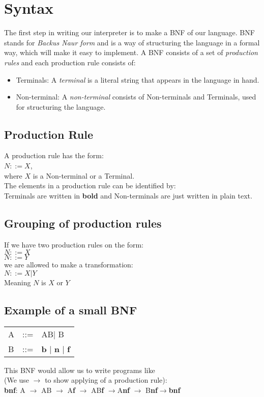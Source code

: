 \section{Syntax}
	The first step in writing our interpreter is to make a BNF of our language. BNF stands for {\it Backus Naur form} and is a way of
	structuring the language in a formal way, which will make it easy to implement. A BNF consists of a set of {\it production rules} and each
	production rule consists of: \\
	\begin{itemize}
		 \item Terminals: A {\it terminal } is a literal string that appears in the language in hand.
		 \item Non-terminal: A {\it non-terminal } consists of Non-terminals and Terminals, used for structuring the language.
	\end{itemize}
	
	\subsection*{Production Rule}
		A production rule has the form: \\
		$N ::= X$, \\
		where $X$ is a Non-terminal or a Terminal. \\
		
		The elements in a production rule can be identified by: \\
		Terminals are written in {\bf bold } and 
		Non-terminals are just written in plain text.
	\subsection*{Grouping of production rules}
		If we have two production rules on the form:\\
		$N ::= X$ \\
		$N ::= Y$ \\
		we are allowed to make a transformation: \\
		$N ::= X | Y$ \\
		Meaning $N$ is $X$ or $Y$ \\
	\subsection*{Example of a small BNF}
		\label{ex-bnf}
		\begin{center}
			\begin{tabular}{l l l}
				A		&	::=		&	 AB$ \mid $ B \\
				B		&	::=		&	{\bf b} $\mid$ {\bf n } $\mid$ {\bf f } \\
			\end{tabular}
		\end{center}
		This BNF would allow us to write programs like \\(We use $\rightarrow$ to show applying of a production rule): \\
		{\bf bnf}: A $\rightarrow$ AB $\rightarrow$ A{\bf f} $\rightarrow$ 
		AB{\bf f} $\rightarrow$A{\bf nf} $\rightarrow$ B{\bf nf}$\rightarrow${\bf bnf } \\
	
